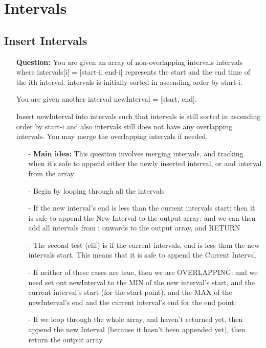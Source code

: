 \documentclass[12pt]{article}
\begin{document}
\section{Intervals}

\subsection{Insert Intervals}
\begin{enumerate}
  \item[] \textbf{Question:} You are given an array of non-overlapping intervals intervals where intervals[i] = [start-i, end-i] represents the start and the end time of the ith interval. intervals is initially sorted in ascending order by start-i.

You are given another interval newInterval = [start, end].

Insert newInterval into intervals such that intervals is still sorted in ascending order by start-i and also intervals still does not have any overlapping intervals. You may merge the overlapping intervals if needed.

    \begin{enumerate}
      \item[-] \textbf{Main idea:} This question involves merging intervals, and tracking when it's safe to append either the newly inserted interval, or and interval from the array
      \item[-] Begin by looping through all the intervals
      \item[-] If the new interval's end is less than the current intervals start: then it is safe to append the New Interval to the output array: and we can then add all intervals from i onwards to the output array, and RETURN
      \item[-] The second test (elif) is if the current intervals, end is less than the new intervals start. This means that it is safe to append the Current Interval
      \item[-] If neither of these cases are true, then we are OVERLAPPING: and we need set out newInterval to the MIN of the new interval's start, and the current interval's start (for the start point), and the MAX of the newInterval's end and the current interval's end for the end point: 
      \item[-] If we loop through the whole array, and haven't returned yet, then append the new Interval (because it hasn't been appended yet), then return the output array

    \end{enumerate}

\end{enumerate}
\end{document}
